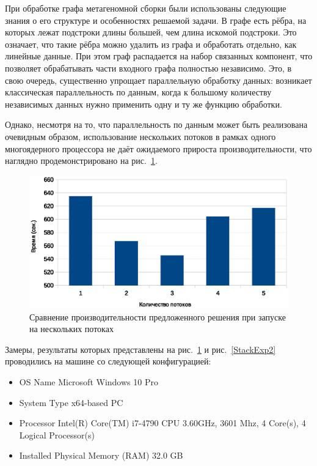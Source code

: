 \documentclass[14pt]{matmex-diploma}
\begin{document}
При обработке графа метагеномной сборки были использованы следующие знания о его структуре и особенностях решаемой задачи. В графе есть рёбра, на которых лежат подстроки длины большей, чем длина искомой подстроки. Это означает, что такие рёбра можно удалить из графа и обработать отдельно, как линейные данные. При этом граф распадается на набор связанных компонент, что позволяет обрабатывать части входного графа полностью независимо. Это, в свою очередь, существенно упрощает параллельную обработку данных: возникает классическая параллельность по данным, когда к большому количеству независимых данных нужно применить одну и ту же функцию обработки. 

Однако, несмотря на то, что параллельность по данным может быть реализована очевидным образом, использование нескольких потоков в рамках одного многоядерного процессора не даёт ожидаемого прироста производительности, что наглядно продемонстрировано на рис.~\ref{StackExp}.

\begin{figure}
 \centering
 \includegraphics[width=15cm]{pics/Stack.eps}
 \caption{Сравнение производительности предложенного решения при запуске на нескольких потоках }
 \label{StackExp}
\end{figure} 

Замеры, результаты которых представлены на рис.~\ref{StackExp} и рис.~\ref{StackExp2} проводились на машине со следующей конфигурацией:
\begin{itemize}
\item OS Name	Microsoft Windows 10 Pro
\item System Type x64-based PC
\item Processor	Intel(R) Core(TM) i7-4790 CPU 3.60GHz, 3601 Mhz, 4 Core(s), 4 Logical Processor(s)
\item Installed Physical Memory (RAM)	32.0 GB
\end{itemize}
\end{document}
